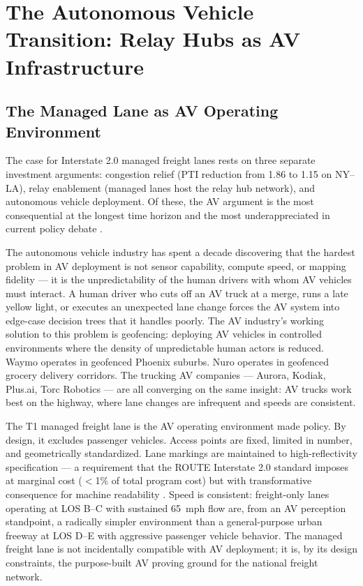 \section{The Autonomous Vehicle Transition: Relay Hubs as AV Infrastructure}
\label{sec:av-transition}

\subsection{The Managed Lane as AV Operating Environment}

The case for Interstate 2.0 managed freight lanes rests on three separate investment
arguments: congestion relief (PTI reduction from 1.86 to 1.15 on NY--LA), relay enablement
(managed lanes host the relay hub network), and autonomous vehicle deployment. Of these, the
AV argument is the most consequential at the longest time horizon and the most underappreciated
in current policy debate \citep{ROUTE_E2}.

The autonomous vehicle industry has spent a decade discovering that the hardest problem in AV
deployment is not sensor capability, compute speed, or mapping fidelity --- it is the
unpredictability of the human drivers with whom AV vehicles must interact. A human driver
who cuts off an AV truck at a merge, runs a late yellow light, or executes an unexpected lane
change forces the AV system into edge-case decision trees that it handles poorly. The AV
industry's working solution to this problem is geofencing: deploying AV vehicles in
controlled environments where the density of unpredictable human actors is reduced. Waymo
operates in geofenced Phoenix suburbs. Nuro operates in geofenced grocery delivery corridors.
The trucking AV companies --- Aurora, Kodiak, Plus.ai, Torc Robotics --- are all converging
on the same insight: AV trucks work best on the highway, where lane changes are infrequent and
speeds are consistent.

The T1 managed freight lane is the AV operating environment made policy. By design, it
excludes passenger vehicles. Access points are fixed, limited in number, and geometrically
standardized. Lane markings are maintained to high-reflectivity specification --- a requirement
that the ROUTE Interstate 2.0 standard imposes at marginal cost ($<$1\% of total program cost)
but with transformative consequence for machine readability \citep{ROUTE_E1}. Speed is
consistent: freight-only lanes operating at LOS B--C with sustained 65~mph flow are, from an
AV perception standpoint, a radically simpler environment than a general-purpose urban freeway
at LOS D--E with aggressive passenger vehicle behavior. The managed freight lane is not
incidentally compatible with AV deployment; it is, by its design constraints, the purpose-built
AV proving ground for the national freight network.

